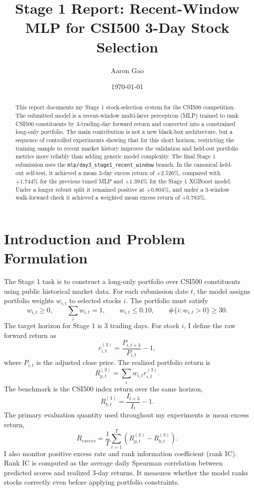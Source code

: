 \documentclass[11pt]{article}
\title{Stage 1 Report: Recent-Window MLP for CSI500 3-Day Stock Selection}
\author{Aaron Gao}
\date{\today}
\begin{document}
\maketitle

\begin{abstract}
This report documents my Stage 1 stock-selection system for the CSI500
competition. The submitted model is a recent-window multi-layer perceptron
(MLP) trained to rank CSI500 constituents by 3-trading-day forward return and
converted into a constrained long-only portfolio. The main contribution is not
a new black-box architecture, but a sequence of controlled experiments showing
that for this short horizon, restricting the training sample to recent market
history improves the validation and held-out portfolio metrics more reliably
than adding generic model complexity. The final Stage 1 submission uses the
\texttt{mlp/day3\_stage1\_recent\_window} branch. In the canonical held-out
self-test, it achieved a mean 3-day excess return of \(+2.526\%\), compared
with \(+1.744\%\) for the previous tuned MLP and \(+1.394\%\) for the Stage 1
XGBoost model. Under a longer robust split it remained positive at
\(+0.804\%\), and under a 3-window walk-forward check it achieved a weighted
mean excess return of \(+0.783\%\).
\end{abstract}

\section{Introduction and Problem Formulation}

The Stage 1 task is to construct a long-only portfolio over CSI500 constituents
using public historical market data. For each submission date \(t\), the model
assigns portfolio weights \(w_{i,t}\) to selected stocks \(i\). The portfolio
must satisfy
\[
    w_{i,t} \ge 0,\qquad
    \sum_i w_{i,t} = 1,\qquad
    w_{i,t} \le 0.10,\qquad
    \#\{i:w_{i,t}>0\}\ge 30.
\]
The target horizon for Stage 1 is 3 trading days. For stock \(i\), I define
the raw forward return as
\[
    r_{i,t}^{(3)} = \frac{P_{i,t+3}}{P_{i,t}} - 1,
\]
where \(P_{i,t}\) is the adjusted close price. The realized portfolio return is
\[
    R_{p,t}^{(3)} = \sum_i w_{i,t} r_{i,t}^{(3)}.
\]
The benchmark is the CSI500 index return over the same horizon,
\[
    R_{b,t}^{(3)} = \frac{I_{t+3}}{I_t} - 1.
\]
The primary evaluation quantity used throughout my experiments is mean excess
return,
\[
    \overline{R}_{excess}
    =
    \frac{1}{T}\sum_{t=1}^{T}\left(R_{p,t}^{(3)}-R_{b,t}^{(3)}\right).
\]
I also monitor positive excess rate and rank information coefficient (rank IC).
Rank IC is computed as the average daily Spearman correlation between predicted
scores and realized 3-day returns. It measures whether the model ranks stocks
correctly even before applying portfolio constraints.
\end{document}
